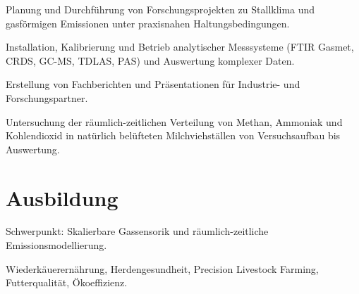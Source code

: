\documentclass[10pt,a4paper]{article}
\begin{document}
\begin{cvitems}

  \item Planung und Durchführung von Forschungsprojekten zu Stallklima und gasförmigen Emissionen unter praxisnahen Haltungsbedingungen.

  \item Installation, Kalibrierung und Betrieb analytischer Messsysteme (FTIR Gasmet, CRDS, GC-MS, TDLAS, PAS) und Auswertung komplexer Daten.

  \item Erstellung von Fachberichten und Präsentationen für Industrie- und Forschungspartner.

\end{cvitems}
\vspace{2pt}

\begin{cvitems}

  \item Untersuchung der räumlich-zeitlichen Verteilung von Methan, Ammoniak und Kohlendioxid in natürlich belüfteten Milchviehställen von Versuchsaufbau bis Auswertung.

\end{cvitems}
\vspace{2pt}


\section*{Ausbildung}


{\small Schwerpunkt: Skalierbare Gassensorik und räumlich-zeitliche Emissionsmodellierung.}\par



{\small Wiederkäuerernährung, Herdengesundheit, Precision Livestock Farming, Futterqualität, Ökoeffizienz.}\par


\end{document}
